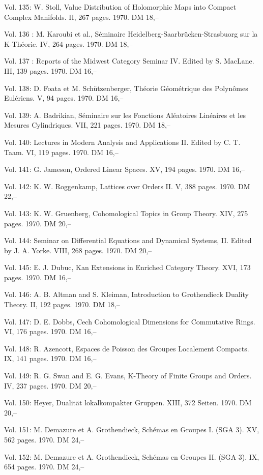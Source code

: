 Vol. 135: W. Stoll, Value Distribution of Holomorphic Maps into Compact Complex Manifolds. II, 267 pages. 1970. DM 18,--

Vol. 136 : M. Karoubi et al., Séminaire Heidelberg-Saarbrücken-Strasbuorg sur la K-Théorie. IV, 264 pages. 1970. DM 18,--

Vol. 137 : Reports of the Midwest Category Seminar IV. Edited by S. MacLane. III, 139 pages. 1970. DM 16,--

Vol. 138: D. Foata et M. Schützenberger, Théorie Géométrique des Polynômes Eulériens. V, 94 pages. 1970. DM 16,--

Vol. 139: A. Badrikian, Séminaire sur les Fonctions Aléatoires Linéaires et les Mesures Cylindriques. VII, 221 pages. 1970. DM 18,--

Vol. 140: Lectures in Modern Analysis and Applications II. Edited by C. T. Taam. VI, 119 pages. 1970. DM 16,--

Vol. 141: G. Jameson, Ordered Linear Spaces. XV, 194 pages. 1970. DM 16,--

Vol. 142: K. W. Roggenkamp, Lattices over Orders II. V, 388 pages. 1970. DM 22,--

Vol. 143: K. W. Gruenberg, Cohomological Topics in Group Theory. XIV, 275 pages. 1970. DM 20,--

Vol. 144: Seminar on Differential Equations and Dynamical Systems, II. Edited by J. A. Yorke. VIII, 268 pages. 1970. DM 20,--

Vol. 145: E. J. Dubuc, Kan Extensions in Enriched Category Theory. XVI, 173 pages. 1970. DM 16,--

Vol. 146: A. B. Altman and S. Kleiman, Introduction to Grothendieck Duality Theory. II, 192 pages. 1970. DM 18,--

Vol. 147: D. E. Dobbs, Cech Cohomological Dimensions for Commutative Rings. VI, 176 pages. 1970. DM 16,--

Vol. 148: R. Azencott, Espaces de Poisson des Groupes Localement Compacts. IX, 141 pages. 1970. DM 16,--

Vol. 149: R. G. Swan and E. G. Evans, K-Theory of Finite Groups and Orders. IV, 237 pages. 1970. DM 20,--

Vol. 150: Heyer, Dualität lokalkompakter Gruppen. XIII, 372 Seiten. 1970. DM 20,--

Vol. 151: M. Demazure et A. Grothendieck, Schémas en Groupes I. (SGA 3). XV, 562 pages. 1970. DM 24,--

Vol. 152: M. Demazure et A. Grothendieck, Schémas en Groupes II. (SGA 3). IX, 654 pages. 1970. DM 24,--

